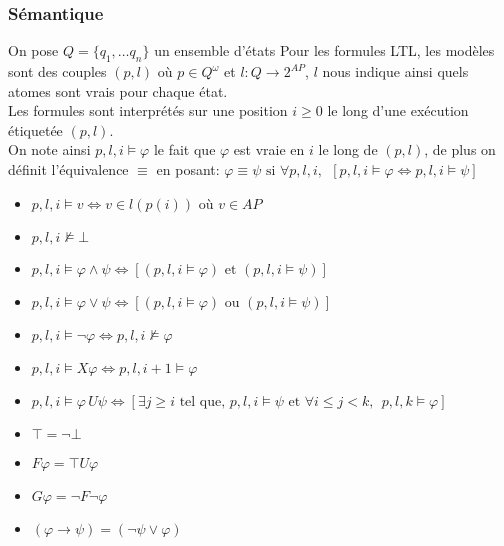 \documentclass[12pt,a4paper]{article}
\theoremstyle{plain}
\theoremstyle{definition}
\begin{document}
\subsubsection{Sémantique}
On pose $Q=\{q_1, \dots q_n\}$ un ensemble d'états  Pour les formules LTL, les modèles sont des couples $(p, l)$ où $p \in Q^\omega$ et $l : Q \to 2^{AP}$, $l$ nous indique ainsi quels atomes sont vrais  pour chaque état. \\
Les formules sont interprétés sur une position $i \geq 0$ le long d'une exécution étiquetée $(p, l)$. \\
On note ainsi $p, l, i \models \varphi$ le fait que $\varphi$ est vraie en $i$ le long de $(p, l)$, de plus on définit l'équivalence $\equiv$ en posant: $\varphi \equiv \psi \textrm{ si } \forall p,l,i, \:\:[p,l,i \models \varphi \Leftrightarrow p,l,i \models \psi]$
\begin{itemize}
	\item[] $p, l, i \models v \Leftrightarrow v \in l(p(i))$ où $v \in AP$
	\item[] $p,l,i \not \models \bot$
	\item[] $p, l, i \models \varphi \land \psi \Leftrightarrow [(p,l,i \models \varphi) \textrm{ et } (p,l,i \models \psi)]$
	\item[] $p,l,i \models \varphi \lor \psi \Leftrightarrow [(p,l,i \models \varphi)\textrm{ ou } (p,l,i \models \psi)]$
	\item[] $p,l,i \models \lnot \varphi \Leftrightarrow p,l,i \not \models \varphi$
	\item[] $p,l,i \models X\varphi \Leftrightarrow p,l,i+1 \models \varphi$
	\item[] $p,l,i \models \varphi\, U \psi \Leftrightarrow [\exists j \geq i\textrm{ tel que, } p,l,i \models \psi \textrm{ et } \forall i \leq j < k, \:\: p,l,k\models \varphi]$
	\item[] $\top = \lnot \bot$
	\item[] $F\varphi = \top U \varphi$
	\item[] $G\varphi = \lnot F \lnot \varphi$
	\item[] $(\varphi \to \psi) = (\lnot \psi \lor \varphi)$
\end{itemize}
\end{document}
